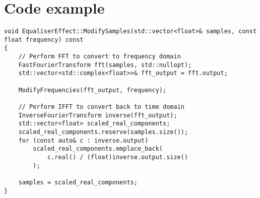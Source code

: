 \documentclass{article}
\begin{document}
	\section { Code example }
		\begin{verbatim}
void EqualiserEffect::ModifySamples(std::vector<float>& samples, const float frequency) const
{
	// Perform FFT to convert to frequency domain
	FastFourierTransform fft(samples, std::nullopt);
	std::vector<std::complex<float>>& fft_output = fft.output;

	ModifyFrequencies(fft_output, frequency);

	// Perform IFFT to convert back to time domain
	InverseFourierTransform inverse(fft_output);
	std::vector<float> scaled_real_components;
	scaled_real_components.reserve(samples.size());
	for (const auto& c : inverse.output)
		scaled_real_components.emplace_back(
			c.real() / (float)inverse.output.size()
		);

	samples = scaled_real_components;
}
	\end{verbatim}
\end{document}
